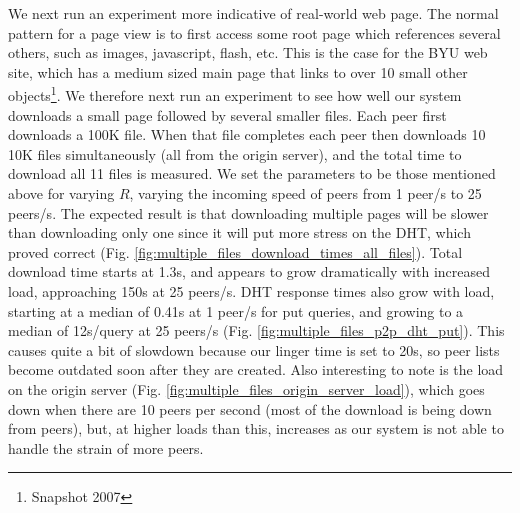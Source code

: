 We next run an experiment more indicative of real-world web page. The normal pattern for a page view 
is to first access some root page which references several others, such as images, 
javascript, flash, etc. This is the case for the BYU web site, which has a medium sized main page that 
links to over 10 small other objects\footnote{ Snapshot 2007}. We therefore next run an experiment 
to see how well our system downloads a small page followed by several smaller files. Each peer first 
downloads a 100K file. When that file completes each peer then downloads 10 10K files simultaneously 
(all from the origin server), and the total time to download all 11 files is measured. We set the parameters 
to be those mentioned above for varying $R$, varying the incoming speed of peers from 1 peer/s to 25 peers/s. 
The expected result is that downloading multiple pages will be slower than downloading only one 
since it will put more stress on the DHT, which proved correct (Fig. \ref{fig:multiple_files_download_times_all_files}). 
Total download time starts at 1.3s, and appears to grow dramatically with increased load, approaching 
150s at 25 peers/s. DHT response times also grow with load, starting 
at a median of 0.41s at 1 peer/s for put queries, and growing to a median of 12s/query at 25 peers/s 
(Fig. \ref{fig:multiple_files_p2p_dht_put}). This causes quite a bit of slowdown because our
linger time is set to 20s, so peer lists become outdated soon after they are created.  Also interesting to note is 
the load on the origin server (Fig. \ref{fig:multiple_files_origin_server_load}), which goes down when there are 
 10 peers per second (most of the download is being down from peers), but, at higher loads than this, increases as our 
system is not able to handle the strain of more peers.


